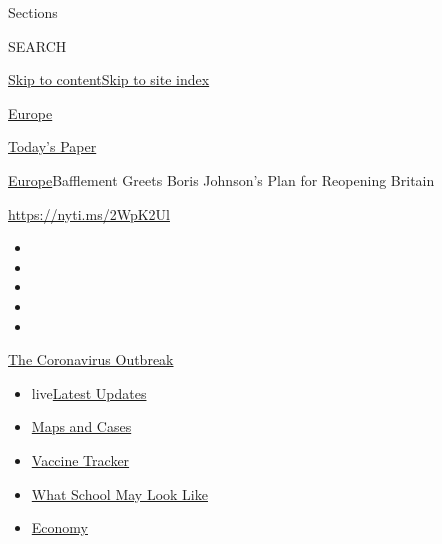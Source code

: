 Sections

SEARCH

\protect\hyperlink{site-content}{Skip to
content}\protect\hyperlink{site-index}{Skip to site index}

\href{https://www.nytimes.com/section/world/europe}{Europe}

\href{https://myaccount.nytimes.com/auth/login?response_type=cookie\&client_id=vi}{}

\href{https://www.nytimes.com/section/todayspaper}{Today's Paper}

\href{/section/world/europe}{Europe}\textbar{}Bafflement Greets Boris
Johnson's Plan for Reopening Britain

\url{https://nyti.ms/2WpK2Ul}

\begin{itemize}
\item
\item
\item
\item
\item
\end{itemize}

\href{https://www.nytimes.com/news-event/coronavirus?action=click\&pgtype=Article\&state=default\&region=TOP_BANNER\&context=storylines_menu}{The
Coronavirus Outbreak}

\begin{itemize}
\tightlist
\item
  live\href{https://www.nytimes.com/2020/08/01/world/coronavirus-covid-19.html?action=click\&pgtype=Article\&state=default\&region=TOP_BANNER\&context=storylines_menu}{Latest
  Updates}
\item
  \href{https://www.nytimes.com/interactive/2020/us/coronavirus-us-cases.html?action=click\&pgtype=Article\&state=default\&region=TOP_BANNER\&context=storylines_menu}{Maps
  and Cases}
\item
  \href{https://www.nytimes.com/interactive/2020/science/coronavirus-vaccine-tracker.html?action=click\&pgtype=Article\&state=default\&region=TOP_BANNER\&context=storylines_menu}{Vaccine
  Tracker}
\item
  \href{https://www.nytimes.com/interactive/2020/07/29/us/schools-reopening-coronavirus.html?action=click\&pgtype=Article\&state=default\&region=TOP_BANNER\&context=storylines_menu}{What
  School May Look Like}
\item
  \href{https://www.nytimes.com/live/2020/07/31/business/stock-market-today-coronavirus?action=click\&pgtype=Article\&state=default\&region=TOP_BANNER\&context=storylines_menu}{Economy}
\end{itemize}

